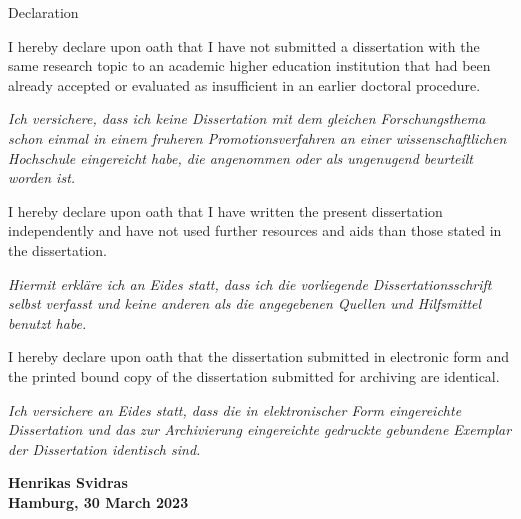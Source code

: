     \begin{abstractpage}{Declaration}
    
        I hereby declare upon oath that I have not submitted a dissertation with the same research topic to an academic higher education institution that had been already accepted or evaluated as insufficient in an earlier doctoral procedure.
        
        \textit{Ich versichere, dass ich keine Dissertation mit dem gleichen Forschungsthema schon einmal in einem fruheren Promotionsverfahren an einer wissenschaftlichen Hochschule eingereicht habe, die angenommen oder als ungenugend beurteilt worden ist.}
        
        I hereby declare upon oath that I have written the present dissertation independently and have not used further resources and aids than those stated in the dissertation.
        
        \textit{Hiermit erkläre ich an Eides statt, dass ich die vorliegende Dissertationsschrift selbst verfasst und keine anderen als die angegebenen Quellen und Hilfsmittel benutzt habe.}
    
    
    
        I hereby declare upon oath that the dissertation submitted in electronic form and the printed bound copy of the dissertation submitted for archiving are identical.
    
        \textit{Ich versichere an Eides statt, dass die in elektronischer Form eingereichte Dissertation und das zur Archivierung eingereichte gedruckte gebundene Exemplar der Dissertation identisch sind.}
    
        \par\bigskip
        \par\bigskip
        
        \begin{flushright}
        \par\bigskip
        \textbf{Henrikas Svidras}\\
        \textbf{Hamburg, 30 March 2023} %

        \end{flushright}
        \end{abstractpage}

